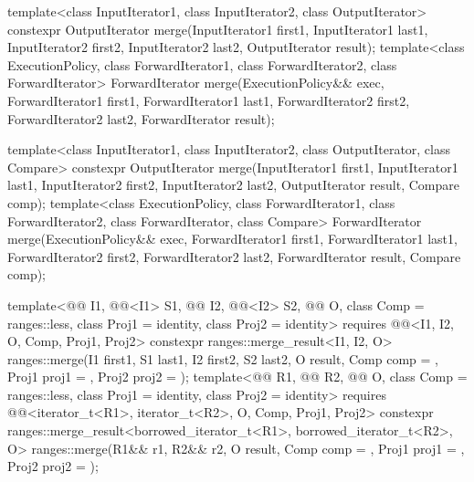 %
\begin{itemdecl}
template<class InputIterator1, class InputIterator2,
         class OutputIterator>
  constexpr OutputIterator
    merge(InputIterator1 first1, InputIterator1 last1,
          InputIterator2 first2, InputIterator2 last2,
          OutputIterator result);
template<class ExecutionPolicy, class ForwardIterator1, class ForwardIterator2,
         class ForwardIterator>
  ForwardIterator
    merge(ExecutionPolicy&& exec,
          ForwardIterator1 first1, ForwardIterator1 last1,
          ForwardIterator2 first2, ForwardIterator2 last2,
          ForwardIterator result);

template<class InputIterator1, class InputIterator2,
         class OutputIterator, class Compare>
  constexpr OutputIterator
    merge(InputIterator1 first1, InputIterator1 last1,
          InputIterator2 first2, InputIterator2 last2,
          OutputIterator result, Compare comp);
template<class ExecutionPolicy, class ForwardIterator1, class ForwardIterator2,
         class ForwardIterator, class Compare>
  ForwardIterator
    merge(ExecutionPolicy&& exec,
          ForwardIterator1 first1, ForwardIterator1 last1,
          ForwardIterator2 first2, ForwardIterator2 last2,
          ForwardIterator result, Compare comp);

template<@@ I1, @@<I1> S1, @@ I2, @@<I2> S2,
         @@ O, class Comp = ranges::less, class Proj1 = identity,
         class Proj2 = identity>
  requires @@<I1, I2, O, Comp, Proj1, Proj2>
  constexpr ranges::merge_result<I1, I2, O>
    ranges::merge(I1 first1, S1 last1, I2 first2, S2 last2, O result,
                  Comp comp = {}, Proj1 proj1 = {}, Proj2 proj2 = {});
template<@@ R1, @@ R2, @@ O, class Comp = ranges::less,
         class Proj1 = identity, class Proj2 = identity>
  requires @@<iterator_t<R1>, iterator_t<R2>, O, Comp, Proj1, Proj2>
  constexpr ranges::merge_result<borrowed_iterator_t<R1>, borrowed_iterator_t<R2>, O>
    ranges::merge(R1&& r1, R2&& r2, O result,
                  Comp comp = {}, Proj1 proj1 = {}, Proj2 proj2 = {});
\end{itemdecl}


